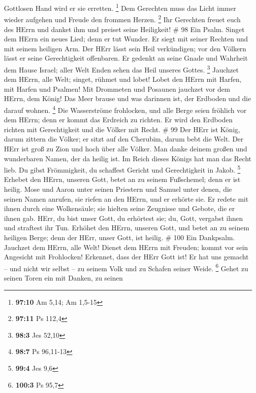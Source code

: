 Gottlosen Hand wird er sie erretten. \footnote{\textbf{97:10} Am 5,14;
  Am 1,5-15}  Dem Gerechten muss das Licht immer wieder
aufgehen und Freude den frommen Herzen. \footnote{\textbf{97:11} Ps
  112,4}  Ihr Gerechten freuet euch des HErrn und danket
ihm und preiset seine Heiligkeit! \# 98  Ein Psalm. Singet
dem HErrn ein neues Lied; denn er tut Wunder. Er siegt mit seiner
Rechten und mit seinem heiligen Arm.  Der HErr lässt sein
Heil verkündigen; vor den Völkern lässt er seine Gerechtigkeit
offenbaren.  Er gedenkt an seine Gnade und Wahrheit dem
Hause Israel; aller Welt Enden sehen das Heil unseres Gottes.
\footnote{\textbf{98:3} Jes 52,10}  Jauchzet dem HErrn, alle
Welt; singet, rühmet und lobet!  Lobet den HErrn mit Harfen,
mit Harfen und Psalmen!  Mit Drommeten und Posaunen jauchzet
vor dem HErrn, dem König!  Das Meer brause und was darinnen
ist, der Erdboden und die darauf wohnen. \footnote{\textbf{98:7} Ps
  96,11-13}  Die Wasserströme frohlocken, und alle Berge
seien fröhlich  vor dem HErrn; denn er kommt das Erdreich zu
richten. Er wird den Erdboden richten mit Gerechtigkeit und die Völker
mit Recht. \# 99  Der HErr ist König, darum zittern die
Völker; er sitzt auf den Cherubim, darum bebt die Welt.  Der
HErr ist groß zu Zion und hoch über alle Völker.  Man danke
deinem großen und wunderbaren Namen, der da heilig ist.  Im
Reich dieses Königs hat man das Recht lieb. Du gibst Frömmigkeit, du
schaffest Gericht und Gerechtigkeit in Jakob. \footnote{\textbf{99:4}
  Jes 9,6}  Erhebet den HErrn, unseren Gott, betet an zu
seinem Fußschemel; denn er ist heilig.  Mose und Aaron unter
seinen Priestern und Samuel unter denen, die seinen Namen anrufen, sie
riefen an den HErrn, und er erhörte sie.  Er redete mit
ihnen durch eine Wolkensäule; sie hielten seine Zeugnisse und Gebote,
die er ihnen gab.  HErr, du bist unser Gott, du erhörtest
sie; du, Gott, vergabst ihnen und straftest ihr Tun. 
Erhöhet den HErrn, unseren Gott, und betet an zu seinem heiligen Berge;
denn der HErr, unser Gott, ist heilig. \# 100  Ein
Dankpsalm. Jauchzet dem HErrn, alle Welt!  Dienet dem HErrn
mit Freuden; kommt vor sein Angesicht mit Frohlocken! 
Erkennet, dass der HErr Gott ist! Er hat uns gemacht -- und nicht wir
selbst -- zu seinem Volk und zu Schafen seiner Weide. \footnote{\textbf{100:3}
  Ps 95,7}  Gehet zu seinen Toren ein mit Danken, zu seinen
